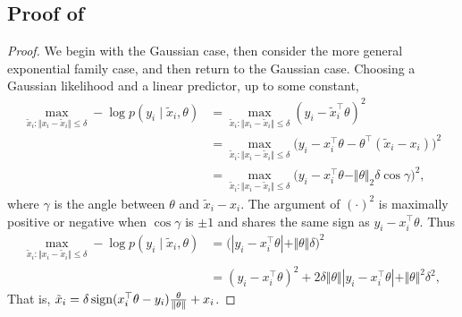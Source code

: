 \subsection{Proof of \lowercase{}}
\begin{proof}
We begin with the Gaussian case, then consider the more general exponential family case, and then return to the Gaussian case.
Choosing a Gaussian likelihood and a linear predictor, up to some constant,
\begin{align*}
    \max_{\widetilde{x}_i: \Vert x_i - \widetilde{x}_i \Vert \leq \delta}-\log p(y_i \mid \widetilde{x}_i, \theta) &= \max_{\widetilde{x}_i: \Vert x_i - \widetilde{x}_i \Vert \leq \delta} (y_i - \widetilde{x}_i^\top \theta)^2 \\
    &= \max_{\widetilde{x}_i: \Vert x_i - \widetilde{x}_i \Vert \leq \delta} \big(y_i -x_i^\top \theta - \theta^\top (\widetilde{x}_i -x_i) \big)^2 \\
    &= \max_{\widetilde{x}_i: \Vert x_i - \widetilde{x}_i \Vert \leq \delta} \big(y_i -x_i^\top \theta - \Vert \theta \Vert_2  \delta \cos \gamma \big)^2,
\end{align*}
where $\gamma$ is the angle between $\theta$ and $\widetilde{x}_i - x_i$.
The argument of $(\cdot)^2$ is maximally positive or negative when $\cos\gamma$ is $\pm 1$ and shares the same sign as $y_i - x_i^\top \theta$. Thus
\begin{align*}
    \max_{\widetilde{x}_i: \Vert x_i - \widetilde{x}_i \Vert \leq \delta}-\log p(y_i \mid \widetilde{x}_i, \theta) &= \big( |y_i - x_i^\top \theta| + \Vert \theta \Vert \delta\big)^2 \\
    &= (y_i - x_i^\top \theta)^2 + 2 \delta \Vert \theta \Vert |y_i - x_i^\top \theta|  + \Vert \theta \Vert^2 \delta^2,
\end{align*}
That is, $\tilde{x}_i =  \delta \operatorname{sign}(x_i^\top \theta - y_i)\frac{\theta}{\|\theta\|} + x_i$. 

\iffalse
\textcolor{red}{Exact loss with explicit constant terms and factors is
$$\frac{1}{2} \log \lp 2\pi \sigma^2\rp + \frac{1}{2\sigma^2} \lp y_i - \widetilde{x}_i^\top \theta \rp^2$$
}
\fi


\end{proof}
